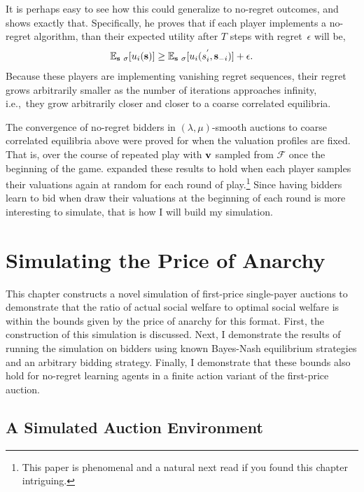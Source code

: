 \documentclass[12pt,twoside]{reedthesis}
\begin{document}
It is perhaps easy to see how this could generalize to no-regret outcomes, and \cite{Roughgarden2016} shows exactly that. Specifically, he proves that if each player implements a no-regret algorithm, than their expected utility after $T$ steps with regret~$\epsilon$ will be,
$$ \mathbb{E}_{\textbf{s} ~ \sigma}[u_i(\textbf{s})] \geq \mathbb{E}_{\textbf{s} ~ \sigma}[u_i(s_i^{'}, \textbf{s}_{-i})] + \epsilon.$$
Because these players are implementing vanishing regret sequences, their regret grows arbitrarily smaller as the number of iterations approaches infinity, i.e.,~they grow arbitrarily closer and closer to a coarse correlated equilibria.

The convergence of no-regret bidders in $(\lambda, \mu)$-smooth auctions to coarse correlated equilibria above were proved for when the valuation profiles are fixed. That is, over the course of repeated play with $\textbf{v}$ sampled from $\mathcal{F}$ once the beginning of the game. \cite{Hartline2015} expanded these results to hold when each player samples their valuations again at random for each round of play.\footnote{This paper is phenomenal and a natural next read if you found this chapter intriguing.} Since having bidders learn to bid when draw their valuations at the beginning of each round is more interesting to simulate, that is how I will build my simulation.
 

\chapter{Simulating the Price of Anarchy}

This chapter constructs a novel simulation of first-price single-payer auctions to demonstrate that the ratio of actual social welfare to optimal social welfare is within the bounds given by the price of anarchy for this format. First, the construction of this simulation is discussed. Next, I demonstrate the results of running the simulation on bidders using known Bayes-Nash equilibrium strategies and an arbitrary bidding strategy. Finally, I demonstrate that these bounds also hold for no-regret learning agents in a finite action variant of the first-price auction.

\section{A Simulated Auction Environment}
\end{document}
